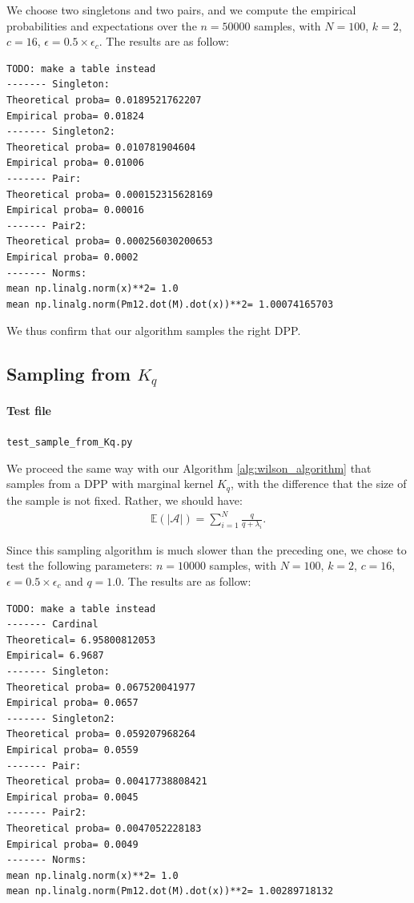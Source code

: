 \documentclass{article}
\newcommand{\abs} [1] {\left| #1 \right|}
\begin{document}
We choose two singletons and two pairs, and we compute the empirical probabilities and expectations over the $n=50000$ samples, with $N=100$, $k=2$, $c=16$, $\epsilon = 0.5 \times \epsilon_c$. The results are as follow:
\begin{verbatim}
TODO: make a table instead
------- Singleton:
Theoretical proba= 0.0189521762207
Empirical proba= 0.01824
------- Singleton2:
Theoretical proba= 0.010781904604
Empirical proba= 0.01006
------- Pair:
Theoretical proba= 0.000152315628169
Empirical proba= 0.00016
------- Pair2:
Theoretical proba= 0.000256030200653
Empirical proba= 0.0002
------- Norms:
mean np.linalg.norm(x)**2= 1.0
mean np.linalg.norm(Pm12.dot(M).dot(x))**2= 1.00074165703
\end{verbatim}


We thus confirm that our algorithm samples the right DPP.


\subsection[Sampling from Kq]{Sampling from $K_q$}


\paragraph{Test file} \verb#test_sample_from_Kq.py#


We proceed the same way with our Algorithm \ref{alg:wilson_algorithm} that samples from a DPP with marginal kernel $K_q$, with the difference that the size of the sample is not fixed. Rather, we should have:
\begin{align} \mathbb{E}\left( \abs{\mathcal{A}}\right) = \sum_{i=1}^{N} \frac{q}{q+\lambda_i}. \end{align}


Since this sampling algorithm is much slower than the preceding one, we chose to test the following parameters: $n=10000$ samples, with $N=100$, $k=2$, $c=16$, $\epsilon = 0.5 \times \epsilon_c$ and $q=1.0$. The results are as follow:
\begin{verbatim}
TODO: make a table instead
------- Cardinal
Theoretical= 6.95800812053
Empirical= 6.9687
------- Singleton:
Theoretical proba= 0.067520041977
Empirical proba= 0.0657
------- Singleton2:
Theoretical proba= 0.059207968264
Empirical proba= 0.0559
------- Pair:
Theoretical proba= 0.00417738808421
Empirical proba= 0.0045
------- Pair2:
Theoretical proba= 0.0047052228183
Empirical proba= 0.0049
------- Norms:
mean np.linalg.norm(x)**2= 1.0
mean np.linalg.norm(Pm12.dot(M).dot(x))**2= 1.00289718132
\end{verbatim}
\end{document}
